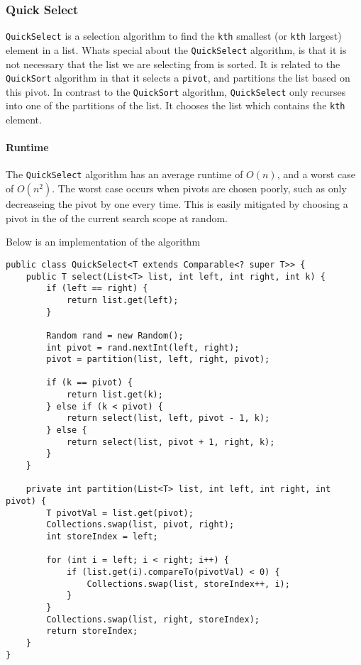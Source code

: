 \documentclass{article}
\begin{document}
    \subsubsection{Quick Select}
    \texttt{QuickSelect} is a selection algorithm to find the \texttt{kth} smallest (or \texttt{kth} largest) element in a list. Whats special about the \texttt{QuickSelect} algorithm, is that it is not necessary that the list we are selecting from is sorted. It is related to the \texttt{QuickSort} algorithm in that it selects a \texttt{pivot}, and partitions the list based on this pivot. In contrast to the \texttt{QuickSort} algorithm, \texttt{QuickSelect} only recurses into one of the partitions of the list. It chooses the list which contains the \texttt{kth} element.
\medskip

\paragraph{Runtime} The \texttt{QuickSelect} algorithm has an average runtime of \( O(n) \), and a worst case of \( O(n^2) \). The worst case occurs when pivots are chosen poorly, such as only decreaseing the pivot by one every time. This is easily mitigated by choosing a pivot in the of the current search scope at random.
\medskip

Below is an implementation of the algorithm

\begin{lstlisting}
public class QuickSelect<T extends Comparable<? super T>> {
    public T select(List<T> list, int left, int right, int k) {
        if (left == right) {
            return list.get(left);
        }

        Random rand = new Random();
        int pivot = rand.nextInt(left, right);
        pivot = partition(list, left, right, pivot);

        if (k == pivot) {
            return list.get(k);
        } else if (k < pivot) {
            return select(list, left, pivot - 1, k);
        } else {
            return select(list, pivot + 1, right, k);
        }
    }

    private int partition(List<T> list, int left, int right, int pivot) {
        T pivotVal = list.get(pivot);
        Collections.swap(list, pivot, right);
        int storeIndex = left;

        for (int i = left; i < right; i++) {
            if (list.get(i).compareTo(pivotVal) < 0) {
                Collections.swap(list, storeIndex++, i);
            }
        }
        Collections.swap(list, right, storeIndex);
        return storeIndex;
    }
}
\end{lstlisting}
\newpage
\end{document}
